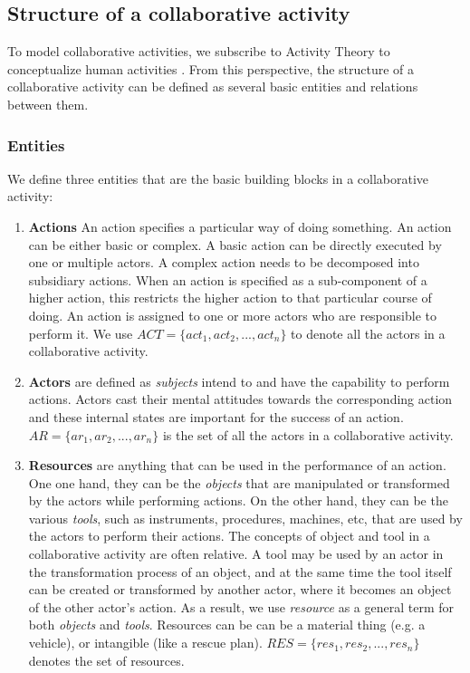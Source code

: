 \subsection{Structure of a collaborative activity} %
\label{sub:structure_of_a_collaborative_activity}
To model collaborative activities, we subscribe to Activity Theory to conceptualize human activities \cite{nardi1996context}. From this perspective, the structure of a collaborative activity can be defined as several basic entities and relations between them.

\subsubsection{Entities} %
\label{ssub:entities}
We define three entities that are the basic building blocks in a collaborative activity:
\begin{enumerate}
	\item \textbf{Actions} An action specifies a particular way of doing something. An action can be either basic or complex. A basic action can be directly executed by one or multiple actors. A complex action needs to be decomposed into subsidiary actions. When an action is specified as a sub-component of a higher action, this restricts the higher action to that particular course of doing. An action is assigned to one or more actors who are responsible to perform it. We use $ACT=\{act_1, act_2, ..., act_n\}$ to denote all the actors in a collaborative activity.
   \item \textbf{Actors} are defined as \emph{subjects} intend to and have the capability to perform actions. Actors cast their mental attitudes towards the corresponding action and these internal states are important for the success of an action. $AR=\{ar_1, ar_2, ..., ar_n\}$ is the set of all the actors in a collaborative activity.
   \item \textbf{Resources} are anything that can be used in the performance of an action. One one hand, they can be the \emph{objects} that are manipulated or transformed by the actors while performing actions. On the other hand, they can be the various \emph{tools}, such as instruments, procedures, machines, etc, that are used by the actors to perform their actions. The concepts of object and tool in a collaborative activity are often relative. A tool may be used by an actor in the transformation process of an object, and at the same time the tool itself can be created or transformed by another actor, where it becomes an object of the other actor's action. As a result, we use \emph{resource} as a general term for both \emph{objects} and \emph{tools}. Resources can be can be a material thing (e.g. a vehicle), or intangible (like a rescue plan). $RES=\{res_1, res_2, ..., res_n\}$ denotes the set of resources. 
\end{enumerate}

